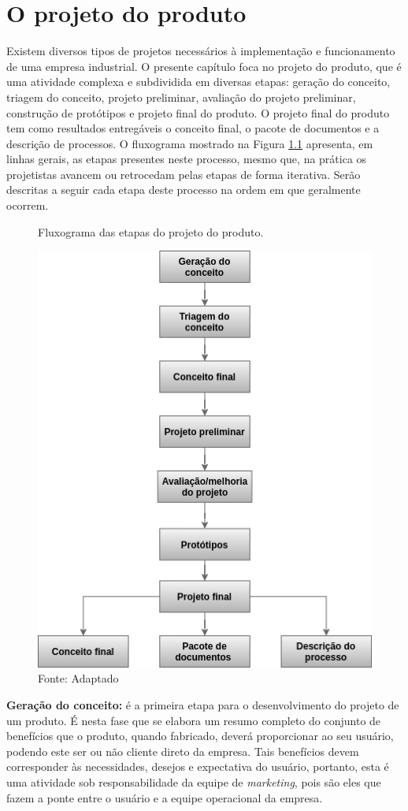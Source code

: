 \chapter{O projeto do produto}
\label{chap:projeto_do_produto}

Existem diversos tipos de projetos necessários à implementação e funcionamento de uma empresa industrial. O presente capítulo foca no projeto do produto, que é uma atividade complexa e subdividida em diversas etapas: geração do conceito, triagem do conceito, projeto preliminar, avaliação do projeto preliminar, construção de protótipos e projeto final do produto.  O projeto final do produto tem como resultados entregáveis o conceito final, o pacote de documentos e a descrição de processos. O fluxograma mostrado na Figura \ref{fig:projeto_produto} apresenta, em linhas gerais, as etapas presentes neste processo, mesmo que, na prática os projetistas avancem ou retrocedam pelas etapas de forma iterativa. Serão descritas a seguir cada etapa deste processo na ordem em que geralmente ocorrem.

\begin{figure}[H]
  \centering
  \caption{Fluxograma das etapas do projeto do produto.}
  \includegraphics[width=.7\textwidth]{images/projeto_produto.png}
  \caption*{Fonte: Adaptado \cite{slack2006administracao} }
  \label{fig:projeto_produto}
\end{figure}

\textbf{Geração do conceito:} é a primeira etapa para o desenvolvimento do projeto de um produto. É nesta fase que se elabora um resumo completo do conjunto de benefícios que o produto, quando fabricado, deverá proporcionar ao seu usuário, podendo este ser ou não cliente direto da empresa. Tais benefícios devem corresponder às necessidades, desejos e expectativa do usuário, portanto, esta é uma atividade sob responsabilidade da equipe de \textit{marketing}, pois são eles que fazem a ponte entre o usuário e a equipe operacional da empresa.

